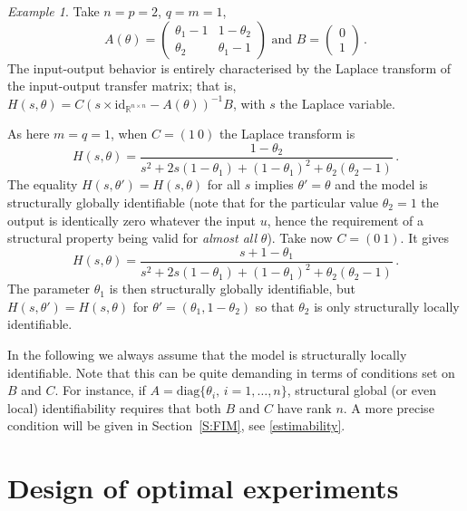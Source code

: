 \documentclass[twocolumn]{autart}
\theoremstyle{definition}
\theoremstyle{remark}
\newtheorem{example}[theorem]{Example}
\newcommand{\R}{\mathbb{R}}
\newcommand{\id}{\mathrm{id}}
\newcommand{\diag}{\mathrm{diag}}
\begin{document}
\begin{example}
Take $n=p=2$, $q=m=1$, 
$$
A(\theta)=\begin{pmatrix}\theta_1 -1 & 1-\theta_2 \\
\theta_2 & \theta_1 -1 
\end{pmatrix} \mbox{ and } B=\begin{pmatrix} 0\\
1
\end{pmatrix} \,.
$$
The input-output behavior is entirely characterised by the Laplace transform of the input-output transfer matrix; that is,
$H(s,\theta)=C (s\times \id_{\R^{n\times n}}-A(\theta))^{-1} B$, with $s$ the Laplace variable.

As here $m=q=1$, when $C=(1\ 0)$ the Laplace transform is
$$
H(s,\theta)= \frac{1-\theta_2}{s^2+2s(1-\theta_1)+(1-\theta_1)^2+\theta_2(\theta_2-1)} \,.
$$
The equality $H(s,\theta')=H(s,\theta)$ for all $s$ implies $\theta'=\theta$ and the model is  structurally globally identifiable (note that for the particular value $\theta_2=1$ the output is identically zero whatever the input $u$, hence the requirement of a structural property being valid for {\em almost all} $\theta$). 
Take now $C=(0\ 1)$. It gives
$$
H(s,\theta)= \frac{s+1-\theta_1}{s^2+2s(1-\theta_1)+(1-\theta_1)^2+\theta_2(\theta_2-1)} \,.
$$
The parameter $\theta_1$ is then structurally globally identifiable, but $H(s,\theta')=H(s,\theta)$ for $\theta'=(\theta_1,1-\theta_2)$ so that $\theta_2$ is only structurally locally identifiable.

\end{example}

In the following we always assume that the model is structurally locally identifiable. Note that this can be quite demanding in terms of conditions set on $B$ and $C$. For instance, if $A=\diag\{\theta_i,\, i=1,\ldots,n\}$, structural global (or even local) identifiability requires that both $B$ and $C$ have  rank $n$. A more precise condition will be given in Section~\ref{S:FIM}, see \eqref{estimability}.



\section{Design of optimal experiments}

\end{document}
